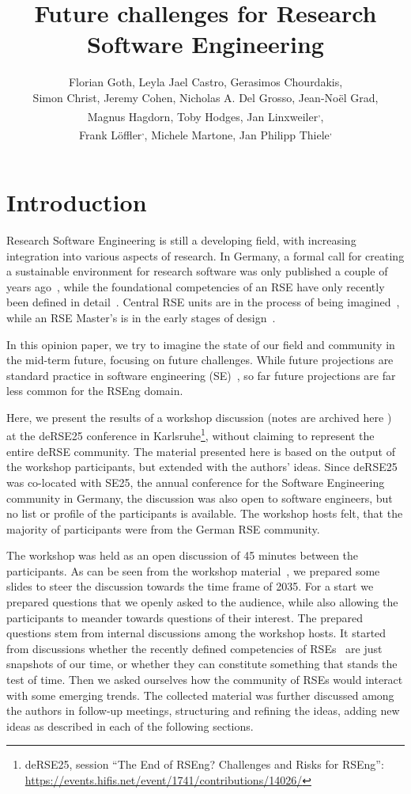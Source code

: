 \documentclass{eceasst}
\title{Future challenges for Research Software Engineering} %
\author{
Florian Goth\authorOrcid{0000-0003-2707-4790}\authorRef{1},
Leyla Jael Castro\authorOrcid{0000-0003-3986-0510}\authorRef{2},
Gerasimos Chourdakis\authorOrcid{0000-0002-3977-1385}\authorRef{3},
\texorpdfstring{\\}{} %
Simon Christ\authorOrcid{0000-0002-5866-1472}\authorRef{4},
Jeremy Cohen\authorOrcid{0000-0003-4312-2537}\authorRef{5},
Nicholas A. Del Grosso\thinspace\authorRef{6},
Jean-Noël Grad\authorOrcid{0000-0002-5821-4912}\authorRef{7},
\texorpdfstring{\\}{} %
Magnus Hagdorn\authorOrcid{0000-0002-5076-4864}\authorRef{8},
Toby Hodges\authorOrcid{0000-0003-1766-456X}\authorRef{9},
Jan Linxweiler\authorOrcid{0000-0002-2755-5087}\authorRef{10}\textsuperscript{,}\authorRef{11},
\texorpdfstring{\\}{} %
Frank Löffler\authorOrcid{0000-0001-6643-6323}\authorRef{12}\textsuperscript{,}\authorRef{11},
Michele Martone\authorOrcid{0000-0003-3239-8554}\authorRef{13},
Jan Philipp Thiele\authorOrcid{0000-0002-8901-6660}\authorRef{10}\textsuperscript{,}\authorRef{14}
} %
\institute{%
\autlabel{1} Institut für theoretische Physik 1, University of Würzburg, 97074, Würzburg, Germany\\
\autlabel{2} ZB MED Information Centre for Life Sciences, Cologne, Germany\\
\autlabel{3} Institute for Parallel and Distributed Systems, University of Stuttgart, Stuttgart, Germany\\
\autlabel{4} Leibniz University Hannover, Department of Cell Biology and Biophysics, Computational Biology, Germany\\
\autlabel{5} Imperial College London, London, UK\\
\autlabel{6} Institute for Experimental Epileptology and Cognition Research, Uniklinikum Bonn, Germany\\
\autlabel{7} Institute for Computational Physics, University of Stuttgart, Germany\\
\autlabel{8} Geschäftsbereich IT, Charité Universitätsmedizin Berlin, Germany\\
\autlabel{9} The Carpentries, USA\\
\autlabel{10} Technische Universität Braunschweig, Germany\\
\autlabel{11} de-RSE e.V.---Society for Research Software in Germany\\
\autlabel{12} Competence Center Digital Research, Friedrich Schiller University Jena, Germany\\
\autlabel{13} Independent researcher, Germany\\
\autlabel{14} Weierstrass Institute, Berlin, Germany;
              Leibniz University Hannover, Institute of Applied Mathematics, Scientific Computing, Hannover, Germany\\
}
\begin{document}
\maketitle

\section{Introduction}

Research Software Engineering is still a developing field,
with increasing integration into various aspects of research.
In Germany, a formal call for creating a sustainable environment for research software
was only published a couple of years ago~\cite{Anzt2021},
while the foundational competencies of an RSE have only recently been defined in detail~\cite{Goth2024}.
Central RSE units are in the process of being imagined~\cite{Kempf2025-draft},
while an RSE Master's is in the early stages of design~\cite{Dehne2025-draft}.

In this opinion paper, we try to imagine the state of our field
and community in the mid-term future, focusing on future challenges.
While future projections are standard practice in software engineering (SE)~\cite{Katz2023,Khan2021,Hu2023,Bosch2016a,Boehm2011},
so far future projections are far less common for the RSEng domain.

Here, we present the results of a workshop discussion (notes are archived here \cite{goth2025_WSPad}) at the
deRSE25 conference in Karlsruhe\footnote{deRSE25, session ``The End of {RSEng}?
Challenges and Risks for {RSEng}'': \url{https://events.hifis.net/event/1741/contributions/14026/}},
without claiming to represent the entire deRSE community.
The material presented here is based on the output of the workshop participants, but extended with the authors' ideas.
Since deRSE25 was co-located with SE25, the annual conference for the Software Engineering community in Germany, the discussion was also open to software engineers, but no list or profile of the participants is available.
The workshop hosts felt, that the majority of participants were from the German RSE community.

The workshop was held as an open discussion of 45 minutes between the participants.
As can be seen from the workshop material~\cite{goth2025_WSPad}, we prepared some slides to steer the discussion
towards the time frame of 2035.
For a start we prepared questions that we openly asked to the audience,
while also allowing the participants to meander towards questions of their interest.
The prepared questions stem from internal discussions among the workshop hosts.
It started from discussions whether the recently defined competencies of RSEs~\cite{Goth2024}
are just snapshots of our time, or whether they can constitute something that stands the test of time.
Then we asked ourselves how the community of RSEs would interact with some emerging trends.
The collected material was further discussed among the authors in follow-up meetings, structuring and refining the ideas, adding new ideas as described in each of the following sections.
\end{document}
